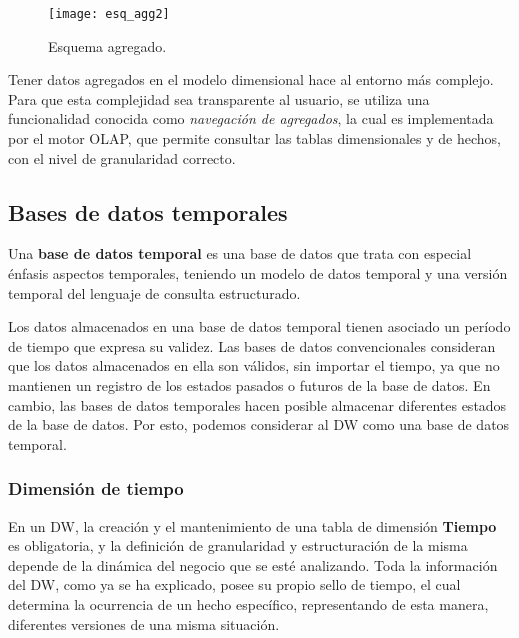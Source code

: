 \documentclass[a4paper,11pt]{article}
\begin{document}
    \begin{figure}
      \begin{center}
        \texttt{[image: esq\_agg2]}
        \caption{Esquema agregado. \cite{agg_tables}}
        \label{sch_agg2}
      \end{center}
    \end{figure}
    
    Tener datos agregados en el modelo dimensional hace al entorno más complejo. Para que esta complejidad sea transparente al usuario, se utiliza
    una funcionalidad conocida como \textit{navegación de agregados}, la cual es implementada por el motor OLAP, que permite consultar las
    tablas dimensionales y de hechos, con el nivel de granularidad correcto.
    
    \subsection{Bases de datos temporales}
    
    Una \textbf{base de datos temporal} es una base de datos que trata con especial énfasis aspectos temporales, teniendo un modelo de datos temporal y una versión
    temporal del lenguaje de consulta estructurado.
    
    Los datos almacenados en una base de datos temporal tienen asociado un período de tiempo que expresa su validez. Las bases de datos convencionales
    consideran que los datos almacenados en ella son válidos, sin importar el tiempo, ya que no mantienen un registro de los estados pasados o futuros de
    la base de datos. En cambio, las bases de datos temporales hacen posible almacenar diferentes estados de la base de datos. Por esto, podemos
    considerar al DW como una base de datos temporal.
    
    
    \subsubsection{Dimensión de tiempo}
    
    En un DW, la creación y el mantenimiento de una tabla de dimensión \textbf{Tiempo} es obligatoria, y la definición de granularidad y estructuración de la misma 
    depende de la dinámica del negocio que se esté analizando. Toda la información del DW, como ya se ha explicado, posee su propio sello de 
    tiempo, el cual determina la ocurrencia de un hecho específico, representando de esta manera, diferentes versiones de una misma situación.
    
\end{document}

